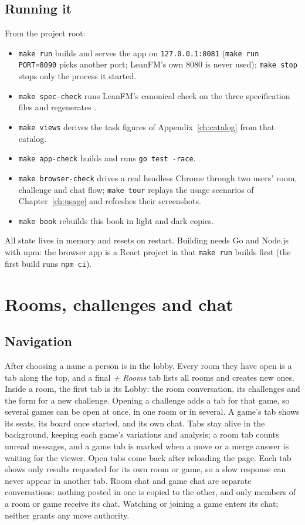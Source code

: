 \documentclass[11pt,oneside]{book}
\begin{document}
\section{Running it}
From the project root:
\begin{itemize}
  \item \texttt{make run} builds and serves the app on \texttt{127.0.0.1:8081}
  (\texttt{make run PORT=8090} picks another port; LeanFM's own 8080 is never
  used); \texttt{make stop} stops only the process it started.
  \item \texttt{make spec-check} runs LeanFM's canonical check on the three
  specification files and regenerates .
  \item \texttt{make views} derives the task figures of Appendix~\ref{ch:catalog}
  from that catalog.
  \item \texttt{make app-check} builds and runs \texttt{go test -race}.
  \item \texttt{make browser-check} drives a real headless Chrome through two
  users' room, challenge and chat flow; \texttt{make tour} replays the usage
  scenarios of Chapter~\ref{ch:usage} and refreshes their screenshots.
  \item \texttt{make book} rebuilds this book in light and dark copies.
\end{itemize}
All state lives in memory and resets on restart. Building needs Go and Node.js
with npm: the browser app is a React project in  that
\texttt{make run} builds first (the first build runs \texttt{npm ci}).

\chapter{Rooms, challenges and chat}
\section{Navigation}
After choosing a name a person is in the lobby. Every room they have open is a
tab along the top, and a final \emph{+ Rooms} tab lists all rooms and creates
new ones. Inside a room, the first tab is its Lobby: the room conversation, its
challenges and the form for a new challenge. Opening a challenge adds a tab for
that game, so several games can be open at once, in one room or in several. A
game's tab shows its seats, its board once started, and its own chat. Tabs stay
alive in the background, keeping each game's variations and analysis; a room tab
counts unread messages, and a game tab is marked when a move or a merge answer
is waiting for the viewer. Open tabs come back after reloading the page. Each tab
shows only results requested for its own room or game, so a slow response can
never appear in another tab.
Room chat and game chat are separate conversations: nothing posted in one is
copied to the other, and only members of a room or game receive its chat.
Watching or joining a game enters its chat; neither grants any move authority.
\end{document}
